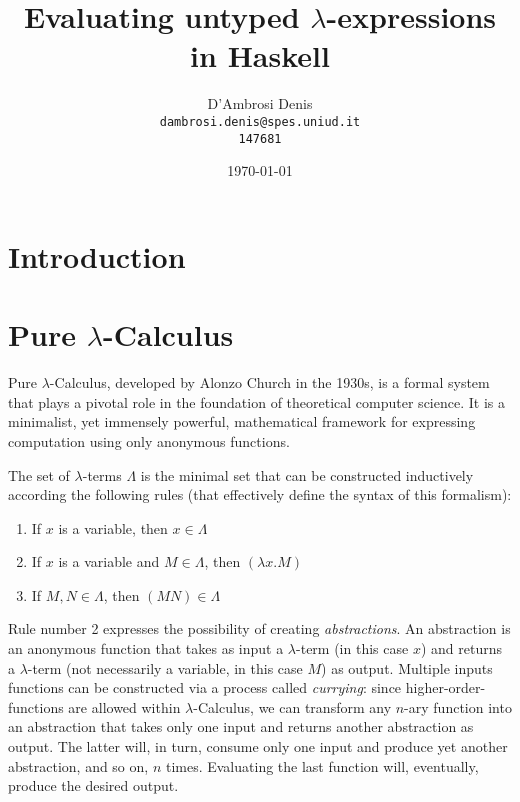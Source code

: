 \documentclass{article}
\title{Evaluating untyped $\lambda$-expressions in Haskell}
\author{D'Ambrosi Denis \\ \small \texttt{dambrosi.denis@spes.uniud.it} \\ \small \texttt{147681}}
\date{\today}
\begin{document}
\maketitle

\begin{abstract}
\end{abstract}

\tableofcontents

\newpage

\section*{Introduction}

\section{Pure $\lambda$-Calculus}

Pure $\lambda$-Calculus, developed by Alonzo Church in the 1930s, is a formal system that plays a pivotal role in the foundation of theoretical computer science. It is a minimalist, yet immensely powerful, mathematical framework for expressing computation using only anonymous functions.

The set of $\lambda$-terms $\Lambda$ is the minimal set that can be constructed inductively according the following rules (that effectively define the syntax of this formalism):

\begin{enumerate}
    \item If $x$ is a variable, then $x \in \Lambda$
    \item If $x$ is a variable and $M \in \Lambda$, then $(\lambda x . M)$
    \item If $M,N \in \Lambda$, then $(M N) \in \Lambda$
\end{enumerate}

Rule number 2 expresses the possibility of creating \textit{abstractions}. An abstraction is an anonymous function that takes as input a $\lambda$-term (in this case $x$) and returns a $\lambda$-term (not necessarily a variable, in this case $M$) as output. Multiple inputs functions can be constructed via a process called \textit{currying}: since higher-order-functions are allowed within $\lambda$-Calculus, we can transform any $n$-ary function into an abstraction that takes only one input and returns another abstraction as output. The latter will, in turn, consume only one input and produce yet another abstraction, and so on, $n$ times. Evaluating the last function will, eventually, produce the desired output.
\end{document}
